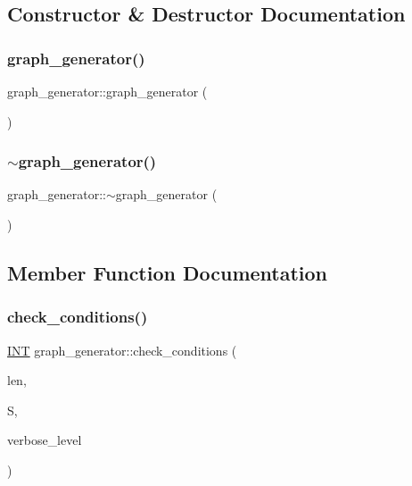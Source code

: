 \subsection{Constructor \& Destructor Documentation}
\mbox{\label{classgraph__generator_a6a8c40385bd0da26f4cacb3d6ff0931a}} 
\subsubsection{\texorpdfstring{graph\+\_\+generator()}{graph\_generator()}}
{\footnotesize\ttfamily graph\+\_\+generator\+::graph\+\_\+generator (\begin{DoxyParamCaption}{ }\end{DoxyParamCaption})}

\mbox{\label{classgraph__generator_a863028a4162a3fdb10b2d79dd89dff9c}} 
\subsubsection{\texorpdfstring{$\sim$graph\+\_\+generator()}{~graph\_generator()}}
{\footnotesize\ttfamily graph\+\_\+generator\+::$\sim$graph\+\_\+generator (\begin{DoxyParamCaption}{ }\end{DoxyParamCaption})}



\subsection{Member Function Documentation}
\mbox{\label{classgraph__generator_a0e74d900ad772c4f39500aa4eccbaee0}} 
\subsubsection{\texorpdfstring{check\+\_\+conditions()}{check\_conditions()}}
{\footnotesize\ttfamily \mbox{\hyperlink{galois_8h_a09fddde158a3a20bd2dcadb609de11dc}{I\+NT}} graph\+\_\+generator\+::check\+\_\+conditions (\begin{DoxyParamCaption}\item[{\mbox{\hyperlink{galois_8h_a09fddde158a3a20bd2dcadb609de11dc}{I\+NT}}}]{len,  }\item[{\mbox{\hyperlink{galois_8h_a09fddde158a3a20bd2dcadb609de11dc}{I\+NT}} $\ast$}]{S,  }\item[{\mbox{\hyperlink{galois_8h_a09fddde158a3a20bd2dcadb609de11dc}{I\+NT}}}]{verbose\+\_\+level }\end{DoxyParamCaption})}

